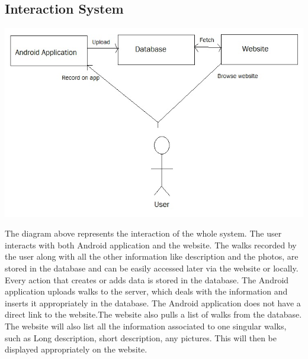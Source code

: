 \documentclass[12pt]{article}
\begin{document}
\subsection{Interaction System}
\includegraphics[scale=0.60]{Project_Plan/docs/system_interaction.jpg}
\par{The diagram above represents the interaction of the whole system. The user interacts with both Android application and the website. The walks recorded by the user along with all the other information like description and the photos, are stored in the database and can be easily accessed later via the website or locally. Every action that creates or adds data is stored in the database.
The Android application uploads walks to the server, which deals with the information and inserts it appropriately in the database. The Android application does not have a direct link to the website.The website also pulls a list of walks from the database. The website will also list all the information associated to one singular walks, such as Long description, short description, any pictures. This will then be displayed appropriately on the website.}
\end{document}

